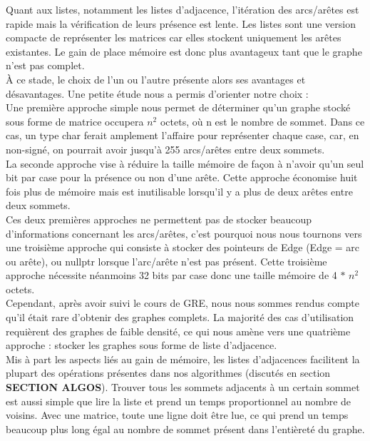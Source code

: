 \documentclass[french]{article}
\begin{document}
			Quant aux listes, notamment les listes d'adjacence, l'itération des arcs/arêtes est rapide mais la vérification de leurs présence est lente. Les listes sont une version compacte de représenter les matrices car elles stockent uniquement les arêtes existantes. Le gain de place mémoire est donc plus avantageux tant que le graphe n'est pas complet.\\
			
			À ce stade, le choix de l'un ou l'autre présente alors ses avantages et désavantages. Une petite étude nous a permis d'orienter notre choix : \\
			
			Une première approche simple nous permet de déterminer qu'un graphe stocké sous forme de matrice occupera $n^2$ octets, où n est le nombre de sommet. Dans ce cas, un type char ferait amplement l'affaire pour représenter chaque case, car, en non-signé, on pourrait avoir jusqu'à 255 arcs/arêtes entre deux sommets.\\
			La seconde approche vise à réduire la taille mémoire de façon à n'avoir qu'un seul bit par case pour la présence ou non d'une arête. Cette approche économise huit fois plus de mémoire mais est inutilisable lorsqu'il y a plus de deux arêtes entre deux sommets.\\
			
			Ces deux premières approches ne permettent pas de stocker beaucoup d'informations concernant les arcs/arêtes, c'est pourquoi nous nous tournons vers une troisième approche qui consiste à stocker des pointeurs de Edge (Edge = arc ou arête), ou nullptr lorsque l'arc/arête n'est pas présent.
			Cette troisième approche nécessite néanmoins 32 bits par case donc une taille mémoire de 4 $*$ $n^2$ octets.\\
			
			Cependant, après avoir suivi le cours de GRE, nous nous sommes rendus compte qu'il était rare d'obtenir des graphes complets. La majorité des cas d'utilisation requièrent des graphes de faible densité, ce qui nous amène vers une quatrième approche : stocker les graphes sous forme de liste d'adjacence.\\
			
			Mis à part les aspects liés au gain de mémoire, les listes d'adjacences facilitent la plupart des opérations présentes dans nos algorithmes (discutés en section \textbf{\color{red}SECTION ALGOS}).
			Trouver tous les sommets adjacents à un certain sommet est aussi simple que lire la liste et prend un temps proportionnel au nombre de voisins. Avec une matrice, toute une ligne doit être lue, ce qui prend un temps beaucoup plus long égal au nombre de sommet présent dans l'entièreté du graphe.
			
\end{document}
